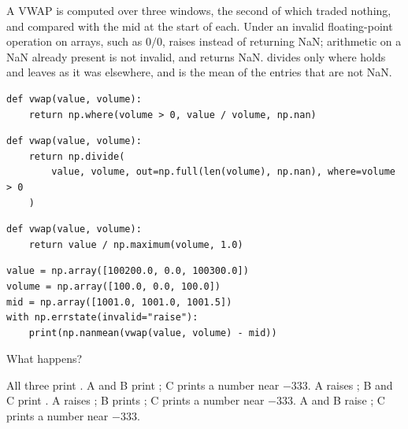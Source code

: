 \begin{question}
\label{question.vwapOfAnEmptyWindowIsNan}
A VWAP is computed over three windows, the second of which traded nothing,
and compared with the mid at the start of each.
Under 
an invalid floating-point operation on arrays, such as $0/0$,
raises  instead of returning NaN;
arithmetic on a NaN already present is not invalid, and returns NaN.
 divides only where  holds
and leaves  as it was elsewhere,
and  is the mean of the entries that are not NaN.
\begin{lstlisting}[caption={Alternative A}, label=listing.emptyWindowA]
def vwap(value, volume):
    return np.where(volume > 0, value / volume, np.nan)
\end{lstlisting}
\begin{lstlisting}[caption={Alternative B}, label=listing.emptyWindowB]
def vwap(value, volume):
    return np.divide(
        value, volume, out=np.full(len(volume), np.nan), where=volume > 0
    )
\end{lstlisting}
\begin{lstlisting}[caption={Alternative C}, label=listing.emptyWindowC]
def vwap(value, volume):
    return value / np.maximum(volume, 1.0)
\end{lstlisting}
\begin{lstlisting}[caption={Run once with each alternative}, label=listing.emptyWindowRun]
value = np.array([100200.0, 0.0, 100300.0])
volume = np.array([100.0, 0.0, 100.0])
mid = np.array([1001.0, 1001.0, 1001.5])
with np.errstate(invalid="raise"):
    print(np.nanmean(vwap(value, volume) - mid))
\end{lstlisting}
What happens?
\begin{choices}
 \choice All three print .
 \choice A and B print ; C prints a number near $-333$.
 \choice A raises ; B and C print .
 \correctchoice A raises ; B prints ;
  C prints a number near $-333$.
 \choice A and B raise ; C prints a number near $-333$.
\end{choices}
\end{question}

